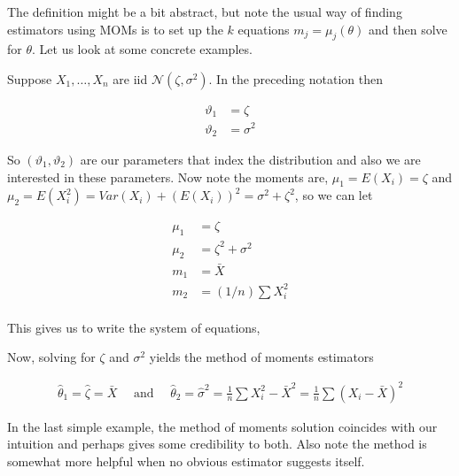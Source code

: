 \documentclass[ 11pt,%
				a4paper,%
				twoside,%
				headinclude,%
				footinclude = true,%
				cleardoublepage = empty,%
				reqno]{scrbook}
\begin{document}



The definition might be a bit abstract, but note the usual way of finding estimators using MOMs is to set up the $k$ equations $m_{j}=\mu_{j}(\theta)$ and then solve for $\theta$. Let us look at some concrete examples.

\begin{example}
Suppose $X_{1}, \ldots, X_{n}$ are iid $\mathcal{N}\left(\zeta, \sigma^{2}\right)$. In the preceding notation then

\begin{align*}
  \vartheta_{1}&=\zeta \\
  \vartheta_{2}&=\sigma^{2}
\end{align*}

So $(\vartheta_{1}, \vartheta_{2})$ are our parameters that index the distribution and also we are interested in these parameters. Now note the moments are, $\mu_{1} = E(X_i)=\zeta$ and $\mu_{2} = E(X_i^2)= Var(X_i) + (E(X_i))^{2} =\sigma^{2}+\zeta^{2}$, so we can let

\begin{align*}
 \mu_{1}&=\zeta \\
 \mu_{2}&=\zeta^{2}+\sigma^{2} \\
  m_{1}&=\bar{X} \\
  m_{2}&=(1 / n) \sum X_{i}^{2} \\
\end{align*}

This gives us to write the system of equations,






Now, solving for $\zeta$ and $\sigma^{2}$ yields the method of moments estimators

\begin{align*}
   \hat{\theta}_1 =\hat{\zeta}=\bar{X} \quad \text { and } \quad \hat{\theta}_2 = \hat{\sigma}^{2}=\frac{1}{n} \sum X_{i}^{2}-\bar{X}^{2}=\frac{1}{n} \sum\left(X_{i}-\bar{X}\right)^{2}
\end{align*}


 \end{example}  
In the last simple example, the method of moments solution coincides with our intuition and perhaps gives some credibility to both. Also note the method is somewhat more helpful when no obvious estimator suggests itself. 
\end{document}
